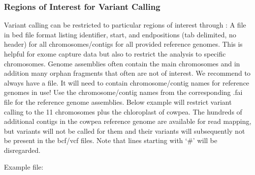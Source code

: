 \documentclass[letterpaper,10pt,english]{sphinxhowto}
\begin{document}
\subsubsection{Regions of Interest for Variant Calling}
\label{\detokenize{index:regions-of-interest-for-variant-calling}}
Variant calling can be restricted to particular regions of interest through : A file in bed file format listing identifier, start\sphinxhyphen{}, and end\sphinxhyphen{}positions (tab delimited, no header) for all chromosomes/contigs for all provided reference genomes. This is helpful for exome capture data but also to restrict the analysis to specific chromosomes. Genome assemblies often contain the main chromosomes and in addition many orphan fragments that often are not of interest. We recommend to always have a  file. It will need to contain  chromosome/contig names for  reference genomes in use! Use the chromosome/contig names from the corresponding .fai file for the reference genome assemblies.
Below example will restrict variant calling to the 11 chromosomes plus the chloroplast of cowpea. The hundreds of additional contigs in the cowpea reference genome are available for read mapping, but variants will not be called for them and their variants will subsequently not be present in the bcf/vcf files. Note that lines starting with ‘\#’ will be disregarded.

Example  file:

\begin{sphinxVerbatim}[commandchars=\\\{\}]
  
  
  
  
  
  
  
  
  
  
  
  
\end{sphinxVerbatim}
\end{document}
